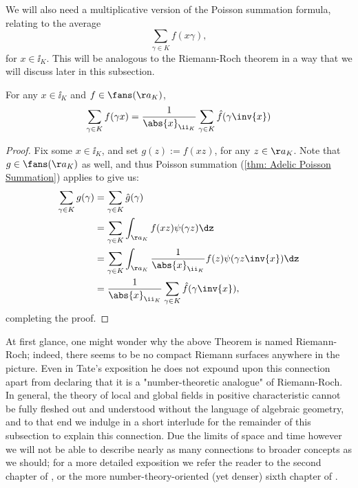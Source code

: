 \documentclass[11pt, x11names, openany]{book}
\begin{document}
We will also need a multiplicative version of the Poisson summation formula, relating to the average
\begin{equation*}
    \sum_{\gamma \in K} f(x \gamma),
\end{equation*}
for $x \in \ii_K$. This will be analogous to the Riemann-Roch theorem in a way that we will discuss later in this subsection.

\begin{theorem}
    \label{thm: adelic riemann-roch}
For any $x \in \ii_K$ and $f \in \fans(\aa_K)$, 
\begin{equation*}
    \sum_{\gamma \in K} f(\gamma x) = \frac{1}{\abs{x}_{\ii_K}} \sum_{ \gamma \in K} \hat{f}(\gamma \inv{x})
\end{equation*}
\end{theorem}

\begin{proof}
Fix some $x \in \ii_K$, and set $g(z) :=  f(xz)$, for any $z \in \aa_K$. Note that $g \in \fans(\aa_K)$ as well, and thus Poisson summation (\ref{thm: Adelic Poisson Summation}) applies to give us:
\begin{align*}
    \sum_{\gamma \in K} g(\gamma) &= \sum_{\gamma \in K} \hat{g}(\gamma)\\
    &= \sum_{\gamma \in K} \int_{\aa_K} f(xz) \psi(\gamma z) \dz\\
    &= \sum_{\gamma \in K} \int_{\aa_K} \frac{1}{\abs{x}_{\ii_K}} f(z) \psi(\gamma z \inv{x}) \dz\\
    &= \frac{1}{\abs{x}_{\ii_K}} \sum_{\gamma \in K} \hat{f}(\gamma \inv{x}),
\end{align*}
completing the proof.
\end{proof}

At first glance, one might wonder why the above Theorem is named Riemann-Roch; indeed, there seems to be no compact Riemann surfaces anywhere in the picture. Even in Tate's exposition he does not expound upon this connection apart from declaring that it is a "number-theoretic analogue" of Riemann-Roch. In general, the theory of local and global fields in positive characteristic cannot be fully fleshed out and understood without the language of algebraic geometry, and to that end we indulge in a short interlude for the remainder of this subsection to explain this connection. Due the limits of space and time however we will not be able to describe nearly as many connections to broader concepts as we should; for a more detailed exposition we refer the reader to the second chapter of \cite{serre2012algebraic}, or the more number-theory-oriented (yet denser) sixth chapter of \cite{weil1974basic}.\\
\end{document}
